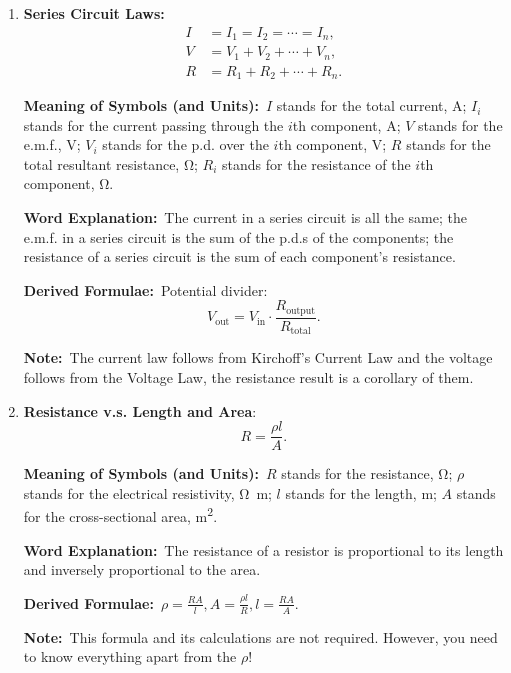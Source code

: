 \documentclass[8pt]{article}
\newcommand{\MeanSymb}{\textbf{Meaning of Symbols (and Units):}\ }
\newcommand{\WordExpl}{\textbf{Word Explanation:}\ }
\newcommand{\DeriForm}{\textbf{Derived Formulae:}\ }
\newcommand{\Note}{\textbf{Note:}\ }
\begin{document}
\begin{enumerate}
                \DeriForm Too many.

                \Note The p.d. and the e.m.f. are the same, as you are effectively measuring the same thing. The result of the current follows from the Kirchoff's Current Law and the resistance formula follows.

                \item \textbf{Series Circuit Laws:}
                \begin{align*}
                    I &= I_1 = I_2 = \cdots = I_n,\\
                    V &= V_1 + V_2 + \cdots + V_n,\\
                    R &= R_1 + R_2 + \cdots + R_n.
                \end{align*}

                \MeanSymb \(I\) stands for the total current, \unit{\ampere}; \(I_i\) stands for the current passing through the \(i\)th component, \unit{\ampere}; \(V\) stands for the e.m.f., \unit{\volt}; \(V_i\) stands for the p.d. over the \(i\)th component, \unit{\volt}; \(R\) stands for the total resultant resistance, \unit{\ohm}; \(R_i\) stands for the resistance of the \(i\)th component, \unit{\ohm}.

                \WordExpl The current in a series circuit is all the same; the e.m.f. in a series circuit is the sum of the p.d.s of the components; the resistance of a series circuit is the sum of each component's resistance.

                \DeriForm Potential divider:
                \[
                    V_{\text{out}} = V_{\text{in}} \cdot \frac{R_{\text{output}}}{R_{\text{total}}}.
                \]

                \Note The current law follows from Kirchoff's Current Law and the voltage follows from the Voltage Law, the resistance result is a corollary of them.

                \item \textbf{Resistance v.s. Length and Area}:
                \[
                    R = \frac{\rho l}{A}.
                \]

                \MeanSymb \(R\) stands for the resistance, \unit{\ohm}; \(\rho\) stands for the electrical resistivity, \unit{\ohm \metre}; \(l\) stands for the length, \unit{\metre}; \(A\) stands for the cross-sectional area, \unit{\metre\squared}.

                \WordExpl The resistance of a resistor is proportional to its length and inversely proportional to the area.

                \DeriForm \(\rho = \frac{RA}{l}, A = \frac{\rho l}{R}, l = \frac{RA}{A}\).

                \Note This formula and its calculations are not required. However, you need to know everything apart from the \(\rho\)!
            \end{enumerate}
\end{document}
